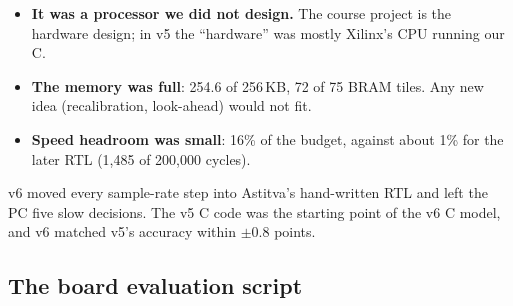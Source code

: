 \documentclass[11pt]{article}
\begin{document}
\begin{lesson}
\begin{itemize}
  \item \textbf{It was a processor we did not design.} The course project is the hardware design; in v5 the ``hardware'' was mostly Xilinx's CPU running our C.
  \item \textbf{The memory was full}: 254.6 of 256\,KB, 72 of 75 BRAM tiles. Any new idea (recalibration, look-ahead) would not fit.
  \item \textbf{Speed headroom was small}: 16\% of the budget, against about 1\% for the later RTL (1,485 of 200,000 cycles).
\end{itemize}
v6 moved every sample-rate step into Astitva's hand-written RTL and left the PC five slow decisions. The v5 C code was the starting point of the v6 C model, and v6 matched v5's accuracy within $\pm0.8$ points.
\end{lesson}

\subsection{The board evaluation script}
\label{sec:evalscript}

\begin{tried}
\end{tried}
\end{document}
